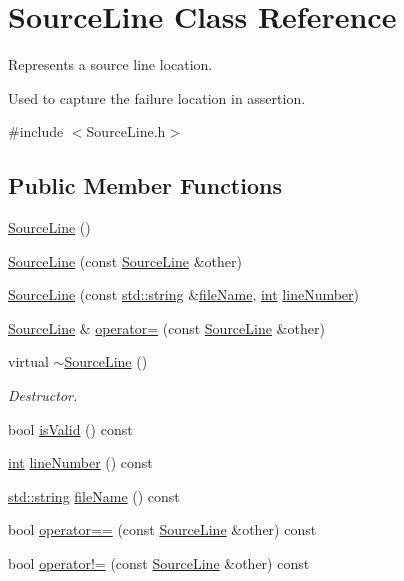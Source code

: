 \hypertarget{class_source_line}{\section{Source\-Line Class Reference}
\label{class_source_line}
}


Represents a source line location.

Used to capture the failure location in assertion.  




{\ttfamily \#include $<$Source\-Line.\-h$>$}

\subsection*{Public Member Functions}
\begin{DoxyCompactItemize}
\item 
\hyperlink{class_source_line_ab320a0cc6ccb20391487b622698c9ea8}{Source\-Line} ()
\item 
\hyperlink{class_source_line_a9fb221c8969d14c88b909af568ab91d5}{Source\-Line} (const \hyperlink{class_source_line}{Source\-Line} \&other)
\item 
\hyperlink{class_source_line_a2a6cc3b13b3e76b64475ba2e9aff29d0}{Source\-Line} (const \hyperlink{glew_8h_ae84541b4f3d8e1ea24ec0f466a8c568b}{std\-::string} \&\hyperlink{class_source_line_a1571a51d45ebcea382b86224ef767a2e}{file\-Name}, \hyperlink{wglew_8h_a500a82aecba06f4550f6849b8099ca21}{int} \hyperlink{class_source_line_ada3cce7f748d6fedffc7f3e9a348bc54}{line\-Number})
\item 
\hyperlink{class_source_line}{Source\-Line} \& \hyperlink{class_source_line_a25e0e26b31c067a85d008240764ed47e}{operator=} (const \hyperlink{class_source_line}{Source\-Line} \&other)
\item 
virtual \hyperlink{class_source_line_afe82eb20dbe4291911d7e369b96b04aa}{$\sim$\-Source\-Line} ()
\begin{DoxyCompactList}\small\item\em Destructor. \end{DoxyCompactList}\item 
bool \hyperlink{class_source_line_a4ebbbf64f2d1688803298dd83cba6c77}{is\-Valid} () const 
\item 
\hyperlink{wglew_8h_a500a82aecba06f4550f6849b8099ca21}{int} \hyperlink{class_source_line_ada3cce7f748d6fedffc7f3e9a348bc54}{line\-Number} () const 
\item 
\hyperlink{glew_8h_ae84541b4f3d8e1ea24ec0f466a8c568b}{std\-::string} \hyperlink{class_source_line_a1571a51d45ebcea382b86224ef767a2e}{file\-Name} () const 
\item 
bool \hyperlink{class_source_line_a6c9eff68161f364725b3a51fc60c3e01}{operator==} (const \hyperlink{class_source_line}{Source\-Line} \&other) const 
\item 
bool \hyperlink{class_source_line_aa4633f46f9c9f470c6b680327d002e86}{operator!=} (const \hyperlink{class_source_line}{Source\-Line} \&other) const 
\end{DoxyCompactItemize}


